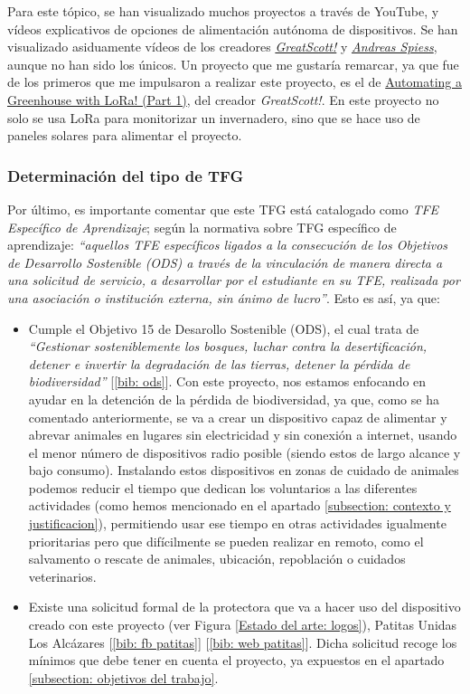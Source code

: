 \documentclass[12pt]{article}
\begin{document}
	\noindent Para este tópico, se han visualizado muchos proyectos a través de YouTube, y vídeos explicativos de opciones de alimentación autónoma de dispositivos. 
	Se han visualizado asiduamente vídeos de los creadores \href{https://www.youtube.com/channel/UC6mIxFTvXkWQVEHPsEdflzQ}{\textit{GreatScott!}} y \href{https://www.youtube.com/channel/UCu7_D0o48KbfhpEohoP7YSQ}{\textit{Andreas Spiess}}, aunque no han sido los únicos. Un proyecto que me gustaría remarcar, ya que fue de los primeros que me impulsaron a realizar este proyecto, es el de \href{https://www.youtube.com/watch?v=2YJHcGQnpAk}{Automating a Greenhouse with LoRa! (Part 1)}, del creador \textit{GreatScott!}. En este proyecto no solo se usa LoRa para monitorizar un invernadero, sino que se hace uso de paneles solares para alimentar el proyecto. 
	
	\subsubsection{Determinación del tipo de TFG}
	
	\noindent Por último, es importante comentar que este TFG está catalogado como \textit{TFE Específico de Aprendizaje}; según la normativa sobre TFG específico de aprendizaje: \textit{``aquellos TFE específicos ligados a la consecución de los Objetivos de Desarrollo Sostenible (ODS) a través de la vinculación de manera directa a una solicitud de servicio, a desarrollar por el estudiante en su TFE, realizada por una asociación o institución externa, sin ánimo de lucro''}. Esto es así, ya que:
	
	\begin{itemize}
		\item Cumple el Objetivo 15 de Desarollo Sostenible (ODS), el cual trata de \textit{``Gestionar sosteniblemente los bosques, luchar contra la desertificación, detener e invertir la degradación de las tierras, detener la pérdida de biodiversidad''} [\ref{bib: ods}]. Con este proyecto, nos estamos enfocando en ayudar en la detención de la pérdida de biodiversidad, ya que, como se ha comentado anteriormente, se va a crear un dispositivo capaz de alimentar y abrevar animales en lugares sin electricidad y sin conexión a internet, usando el menor número de dispositivos radio posible (siendo estos de largo alcance y bajo consumo). Instalando estos dispositivos en zonas de cuidado de animales podemos reducir el tiempo que dedican los voluntarios a las diferentes actividades (como hemos mencionado en el apartado \ref{subsection: contexto y justificacion}), permitiendo usar ese tiempo en otras actividades igualmente prioritarias pero que difícilmente se pueden realizar en remoto, como el salvamento o rescate de animales, ubicación, repoblación o cuidados veterinarios. 
		\item Existe una solicitud formal de la protectora que va a hacer uso del dispositivo creado con este proyecto (ver Figura \ref{Estado del arte: logos}), Patitas Unidas Los Alcázares [\ref{bib: fb patitas}] [\ref{bib: web patitas}]. Dicha solicitud recoge los mínimos que debe tener en cuenta el proyecto, ya expuestos en el apartado \ref{subsection: objetivos del trabajo}.
	\end{itemize}
	
\end{document}
